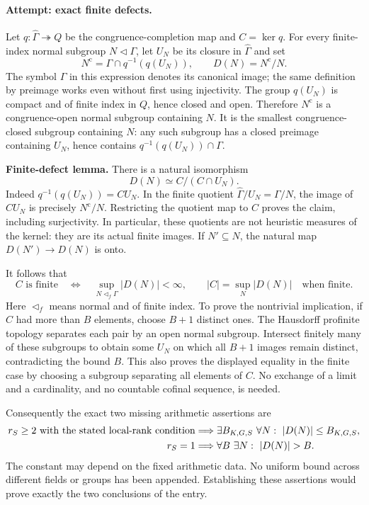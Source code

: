 \documentclass[11pt,a4paper]{article}
\numberwithin{equation}{section}
\begin{document}
\paragraph{Attempt: exact finite defects.}
Let $q:\widehat\Gamma\twoheadrightarrow Q$ be the congruence-completion
map and $C=\ker q$.  For every finite-index normal subgroup
$N\triangleleft\Gamma$, let $U_N$ be its closure in $\widehat\Gamma$ and
set
\[
 N^{\mathrm c}=\Gamma\cap q^{-1}(q(U_N)),\qquad
 D(N)=N^{\mathrm c}/N.
\]
The symbol $\Gamma$ in this expression denotes its canonical image; the
same definition by preimage works even without first using injectivity.
The group $q(U_N)$ is compact and of finite index in $Q$, hence closed
and open.  Therefore $N^{\mathrm c}$ is a congruence-open normal subgroup
containing $N$.  It is the smallest congruence-closed subgroup containing
$N$: any such subgroup has a closed preimage containing $U_N$, hence
contains $q^{-1}(q(U_N))\cap\Gamma$.

\textbf{Finite-defect lemma.} There is a natural isomorphism
\begin{equation}\label{119:defect}
 D(N)\simeq C/(C\cap U_N).
\end{equation}
Indeed $q^{-1}(q(U_N))=CU_N$.  In the finite quotient
$\widehat\Gamma/U_N=\Gamma/N$, the image of $CU_N$ is precisely
$N^{\mathrm c}/N$.  Restricting the quotient map to $C$ proves the
claim, including surjectivity.  In particular, these quotients are not
heuristic measures of the kernel: they are its actual finite images.
If $N'\subseteq N$, the natural map $D(N')\to D(N)$ is onto.

It follows that
\begin{equation}\label{119:equivalence}
 C\text{ is finite}\quad\Longleftrightarrow\quad
 \sup_{N\triangleleft_f\Gamma}|D(N)|<\infty,
 \qquad
 |C|=\sup_N|D(N)|\quad\text{when finite}.
\end{equation}
Here $\triangleleft_f$ means normal and of finite index.  To prove the
nontrivial implication, if $C$ had more than $B$ elements, choose $B+1$
distinct ones.  The Hausdorff profinite topology separates each pair by
an open normal subgroup.  Intersect finitely many of these subgroups to
obtain some $U_N$ on which all $B+1$ images remain distinct, contradicting
the bound $B$.  This also proves the displayed equality in the finite
case by choosing a subgroup separating all elements of $C$.
No exchange of a limit and a cardinality, and no countable cofinal
sequence, is needed.

Consequently the exact two missing arithmetic assertions are
\begin{align}\label{119:targets}
 r_S\geq2\text{ with the stated local-rank condition}
 &\Longrightarrow \exists B_{K,G,S}\ \forall N:\ |D(N)|\leq B_{K,G,S},\\
 r_S=1&\Longrightarrow \forall B\ \exists N:\ |D(N)|>B.\notag
\end{align}
The constant may depend on the fixed arithmetic data.  No uniform bound
across different fields or groups has been appended.  Establishing these
assertions would prove exactly the two conclusions of the entry.
\end{document}
